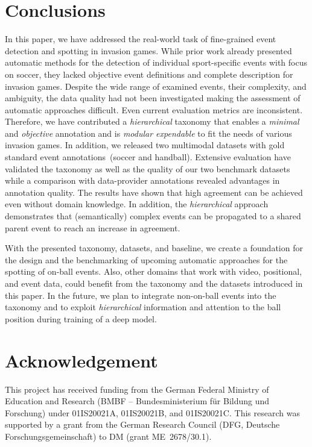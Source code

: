 \section{Conclusions}\label{sec:conclusion}
In this paper, we have addressed the real-world task of fine-grained event detection and spotting in invasion games. 
While prior work already presented automatic methods for the detection of individual sport-specific events with focus on soccer, they lacked objective event definitions and complete description for invasion games.
Despite the wide range of examined events, their complexity, and ambiguity, the data quality had not been investigated making the assessment of automatic approaches difficult. Even current evaluation metrics are inconsistent. 
Therefore, we have contributed a \textit{hierarchical} taxonomy that enables a \textit{minimal} and \textit{objective} annotation and is \textit{modular expendable} to fit the needs of various invasion games. 
In addition, we released two multimodal datasets with gold standard event annotations~(soccer and handball).
Extensive evaluation have validated the taxonomy as well as the quality of our two benchmark datasets while a comparison with data-provider annotations revealed advantages in annotation quality.
The results have shown that high agreement can be achieved even without domain knowledge. In addition, the \textit{hierarchical} approach demonstrates that (semantically) complex events can be propagated to a shared parent event to reach an increase in agreement.

With the presented taxonomy, datasets, and baseline, we create a foundation for the design and the benchmarking of upcoming automatic approaches for the spotting of on-ball events.
Also, other domains that work with video, positional, and event data, could benefit from the taxonomy and the datasets introduced in this paper.
In the future, we plan to integrate non-on-ball events into the taxonomy and to exploit \textit{hierarchical} information and attention to the ball position during training of a deep model.

\section*{Acknowledgement}
This project has received funding from the German Federal Ministry of Education and Research (BMBF -- Bundesministerium für Bildung und Forschung) under 01IS20021A, 01IS20021B, and 01IS20021C.
This research was supported by a grant from the German Research Council (DFG, Deutsche Forschungsgemeinschaft) to DM (grant ME~2678/30.1).

